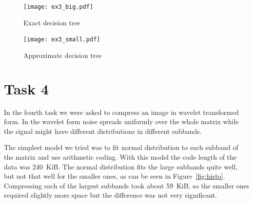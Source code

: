 \documentclass{article}
\begin{document}
\begin{figure}
    \centerline{\texttt{[image: ex3\_big.pdf]}}
    \caption{Exact decision tree}\label{fig:ex3big}
\end{figure}

\begin{figure}
    \begin{center}
    \texttt{[image: ex3\_small.pdf]}
    \end{center}
    \caption{Approximate decision tree}\label{fig:ex3small}
\end{figure}

\section{Task 4}

In the fourth task we were asked to compress an image in wavelet transformed form. In the wavelet form noise spreads
uniformly over the whole matrix while the signal might have different distributions in different subbands.

The simplest model we tried was to fit normal distribution to each subband of the matrix and use arithmetic coding.
With this model the code length of the data was 240~KiB. The normal distribution fits the large subbands quite well, but not that well for the smaller ones, as can be seen in Figure~\ref{fig:histo}. Compressing each of the largest subbands took about 59~KiB, so the smaller ones required slightly more space but the difference was not very significant.
\end{document}
